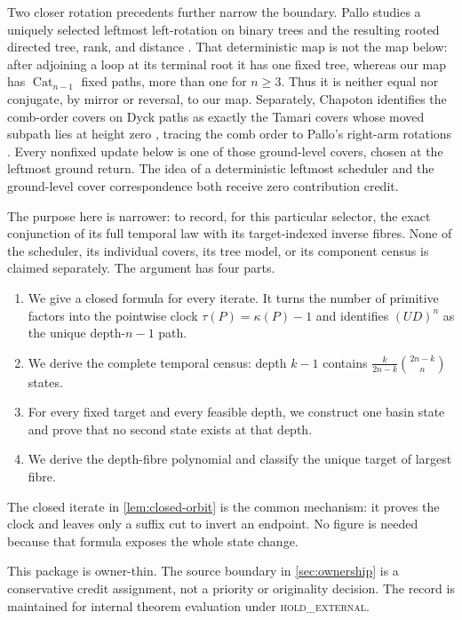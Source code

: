 \documentclass[10pt,a4paper]{amsart}
\theoremstyle{definition}
\theoremstyle{remark}
\newcommand{\Cat}{\operatorname{Cat}}
\newcommand{\fac}{\kappa}
\begin{document}
Two closer rotation precedents further narrow the boundary.  Pallo studies a
uniquely selected leftmost left-rotation on binary trees and the resulting
rooted directed tree, rank, and distance
\cite[pp.~802--803]{Pallo2006Rotational}.  That deterministic map is not the
map below: after adjoining a loop at its terminal root it has one fixed tree,
whereas our map has $\Cat_{n-1}$ fixed paths, more than one for $n\geq3$.
Thus it is neither equal nor conjugate, by mirror or reversal, to our map.
Separately, Chapoton identifies the comb-order covers on Dyck paths as exactly
the Tamari covers whose moved subpath lies at height zero
\cite[\S1.2, p.~438]{Chapoton2020DyckOrder}, tracing the comb order to Pallo's
right-arm rotations \cite{Pallo2003RightArm}.  Every nonfixed update below is
one of those ground-level covers, chosen at the leftmost ground return.  The
idea of a deterministic leftmost scheduler and the ground-level cover
correspondence both receive zero contribution credit.

The purpose here is narrower: to record, for this particular selector, the
exact conjunction of its full temporal law with its target-indexed inverse
fibres.  None of the scheduler, its individual covers, its tree model, or its
component census is claimed separately.  The argument has four parts.
\begin{enumerate}[label=\textup{(\arabic*)}]
\item We give a closed formula for every iterate.  It turns the number of
primitive factors into the pointwise clock $\tau(P)=\fac(P)-1$ and identifies
$(UD)^n$ as the unique depth-$n-1$ path.
\item We derive the complete temporal census: depth $k-1$ contains
$\frac{k}{2n-k}\binom{2n-k}{n}$ states.
\item For every fixed target and every feasible depth, we construct one basin
state and prove that no second state exists at that depth.
\item We derive the depth-fibre polynomial and classify the unique target of
largest fibre.
\end{enumerate}
The closed iterate in \cref{lem:closed-orbit} is the common mechanism: it
proves the clock and leaves only a suffix cut to invert an endpoint.  No figure
is needed because that formula exposes the whole state change.

This package is owner-thin.  The source boundary in
\cref{sec:ownership} is a conservative credit assignment, not a priority or
originality decision.  The record is maintained for internal theorem
evaluation under \textsc{hold\_external}.
\end{document}

